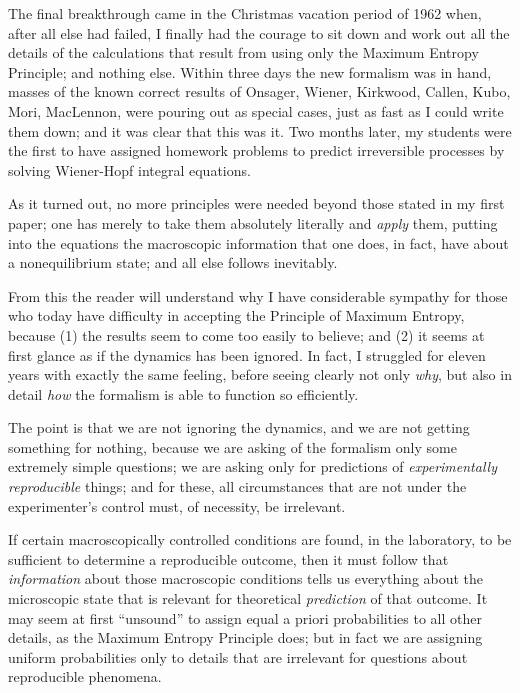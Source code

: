 The final breakthrough came in the Christmas vacation period of 1962 when, after all else had failed, I finally had the courage to sit down and work out all the details of the calculations that result from using only the Maximum Entropy Principle; and nothing else.
Within three days the new formalism was in hand, masses of the known correct results of Onsager, Wiener, Kirkwood, Callen, Kubo, Mori, MacLennon, were pouring out as special cases, just as fast as I could write them down; and it was clear that this was it.
Two months later, my students were the first to have assigned homework problems to predict irreversible processes by solving Wiener-Hopf integral equations.

As it turned out, no more principles were needed beyond those stated in my first paper; one has merely to take them absolutely literally and \emph{apply} them, putting into the equations the macroscopic information that one does, in fact, have about a nonequilibrium state; and all else follows inevitably.

From this the reader will understand why I have considerable sympathy for those who today have difficulty in accepting the Principle of Maximum Entropy, because (1) the results seem to come too easily to believe; and (2) it seems at first glance as if the dynamics has been ignored.
In fact, I struggled for eleven years with exactly the same feeling, before seeing clearly not only \emph{why}, but also in detail \emph{how} the formalism is able to function so efficiently.

The point is that we are not ignoring the dynamics, and we are not getting something for nothing, because we are asking of the formalism only some extremely simple questions; we are asking only for predictions of \emph{experimentally reproducible} things; and for these, all circumstances that are not under the experimenter's control must, of necessity, be irrelevant.

If certain macroscopically controlled conditions are found, in the laboratory, to be sufficient to determine a reproducible outcome, then it must follow that \emph{information} about those macroscopic conditions tells us everything about the microscopic state that is relevant for theoretical \emph{prediction} of that outcome.
It may seem at first ``unsound'' to assign equal a priori probabilities to all other details, as the Maximum Entropy Principle does; but in fact we are assigning uniform probabilities only to details that are irrelevant for questions about reproducible phenomena.

